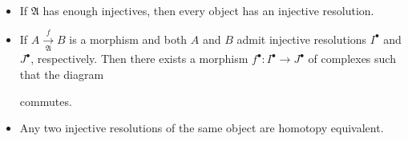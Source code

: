 \documentclass[11pt,a4paper,footinclude=true,headinclude=true]{scrbook} %
\newcommand{\Af}{\mathfrak{A}}
\newcommand{\<}{\langle}
\newcommand{\>}{\rangle}
\newenvironment{lemma}[2][]
{\renewcommand\theinnercustomlemma{#2}\innercustomlemma[#1]
\begin{mdframed}[backgroundcolor=gray!20]\ }
{\end{mdframed}\endinnercustomprop}
\begin{document}
\begin{lemma}{1.A}\mbox{}
    \begin{itemize}
        \item[(i)] If $\Af$ has enough injectives, then every object has an injective resolution.
        \item[(ii)] If $A\xrightarrow[\Af]{f}B$ is a morphism and both $A$ and $B$ admit injective resolutions $I^\bullet$ and $J^\bullet$, respectively. Then there exists a morphism $f^\bullet:I^\bullet\to J^\bullet$ of complexes such that the diagram 
        \begin{center}
        \end{center}
        commutes.
        \item[(iii)] Any two injective resolutions of the same object are homotopy equivalent.
    \end{itemize}
\end{lemma}
\end{document}
